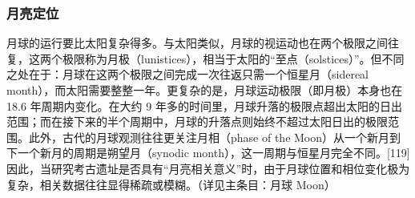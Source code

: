 \subsubsection{月亮定位}
月球的运行要比太阳复杂得多。与太阳类似，月球的视运动也在两个极限之间往复，这两个极限称为月极（lunistices），相当于太阳的“至点（solstices）”。但不同之处在于：月球在这两个极限之间完成一次往返只需一个恒星月（sidereal month），而太阳需要整整一年。更复杂的是，月球运动极限（即月极）本身也在18.6 年周期内变化。在大约 9 年多的时间里，月球升落的极限点超出太阳的日出范围；而在接下来的半个周期中，月球的升落点则始终不超过太阳日出的极限范围。此外，古代的月球观测往往更关注月相（phase of the Moon）从一个新月到下一个新月的周期是朔望月（synodic month），这一周期与恒星月完全不同。[119]因此，当研究考古遗址是否具有“月亮相关意义”时，由于月球位置和相位变化极为复杂，相关数据往往显得稀疏或模糊。（详见主条目：月球 Moon）
